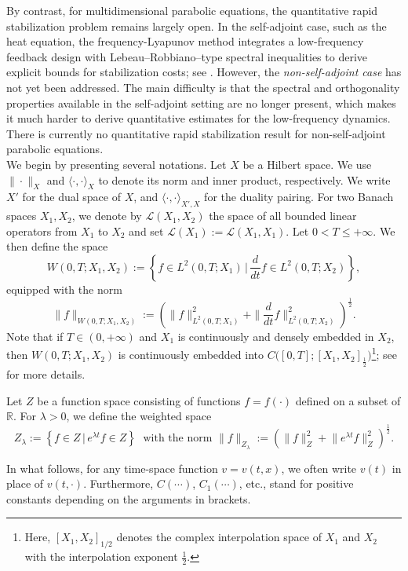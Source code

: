 \documentclass[a4paper]{article}
\numberwithin{equation}{section}
\begin{document}
By contrast, for multidimensional parabolic equations, the quantitative rapid stabilization problem remains largely open. In the self-adjoint case, such as the heat equation, the frequency-Lyapunov method integrates a low-frequency feedback design with Lebeau--Robbiano--type spectral inequalities to derive explicit bounds for stabilization costs; see \cite{X1,X2}. However, the {\it non-self-adjoint case} has not yet been addressed. The main difficulty is that the spectral and orthogonality properties available in the self-adjoint setting are no longer present, which makes it much harder to derive quantitative estimates for the low-frequency dynamics. There is currently no quantitative rapid stabilization result for non-self-adjoint parabolic equations.\\[-2mm]

We begin by presenting several notations. Let $X$ be a Hilbert space. We use $\|\cdot\|_X$ and $\langle\cdot,\cdot\rangle_X$ to denote its norm and inner product, respectively. We write $X'$ for the dual space of $X$, and $\langle\cdot,\cdot\rangle_{X',X}$ for the duality pairing. For two Banach spaces $X_1,X_2$, we denote by $\mathcal{L}(X_1,X_2)$ the space of all bounded linear operators from $X_1$ to $X_2$ and set $\mathcal{L}(X_1):=\mathcal{L}(X_1,X_1)$. Let $0<T\le +\infty$. We then define the space
$$ W(0,T;X_1, X_2) := \left\{ f \in L^2(0,T; X_1) \,\bigg|\, \frac{d}{dt} f \in L^2(0,T; X_2) \right\},$$ 
equipped with the norm
$$\|f\|_{W(0,T; X_1, X_2)} := \left( \|f\|_{L^2(0,T; X_1)}^2 + \|\frac{d}{dt}f\|_{L^2(0,T; X_2)}^2 \right)^{\frac 12}.$$
Note that if $T\in(0,+\infty)$ and $X_1$ is continuously and densely embedded in $X_2$, then $W(0, T; X_1, X_2)$ is continuously embedded into $C\big([0, T]; [X_1, X_2]_{\frac{1}{2}}\big)$\footnote{Here, $[X_1,X_2]_{1/2}$ denotes the complex interpolation space of $X_1$ and $X_2$ with the interpolation exponent $\tfrac12$.}; see \cite{LM} for more details.


Let $Z$ be a function space consisting of functions $f=f(\cdot)$ defined on a subset of $\mathbb{R}$. For $\lambda>0$, we define the weighted space
$$Z_{\lambda} := \left\{ f \in Z \,\big|\, e^{\lambda t} f \in Z \right\} \;\textrm{ with the norm } \|f\|_{Z_{\lambda}} := \left( \|f\|_Z^2 + \big\| e^{\lambda t} f \big\|_Z^2 \right)^{\frac12}.$$

In what follows, for any time-space function $v=v(t,x)$, we often write $v(t)$ in place of $v(t,\cdot)$.  Furthermore, $C(\cdots)$, $C_1(\cdots)$, etc., stand for positive constants depending on the arguments in brackets.
\end{document}

